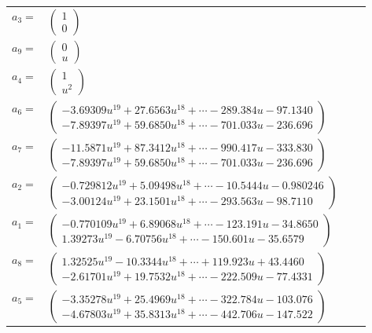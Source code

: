 \documentclass[1p]{elsarticle_modified}
\theoremstyle{definition}
\begin{document}
\begin{tabular}{m{7pt} m{180pt} m{7pt} m{180pt} }
\flushright $a_{3}=$&$\begin{pmatrix}1\\0\end{pmatrix}$ \\
\flushright $a_{9}=$&$\begin{pmatrix}0\\u\end{pmatrix}$ \\
\flushright $a_{4}=$&$\begin{pmatrix}1\\u^2\end{pmatrix}$ \\
\flushright $a_{6}=$&$\begin{pmatrix}-3.69309 u^{19}+27.6563 u^{18}+\cdots-289.384 u-97.1340\\-7.89397 u^{19}+59.6850 u^{18}+\cdots-701.033 u-236.696\end{pmatrix}$ \\
\flushright $a_{7}=$&$\begin{pmatrix}-11.5871 u^{19}+87.3412 u^{18}+\cdots-990.417 u-333.830\\-7.89397 u^{19}+59.6850 u^{18}+\cdots-701.033 u-236.696\end{pmatrix}$ \\
\flushright $a_{2}=$&$\begin{pmatrix}-0.729812 u^{19}+5.09498 u^{18}+\cdots-10.5444 u-0.980246\\-3.00124 u^{19}+23.1501 u^{18}+\cdots-293.563 u-98.7110\end{pmatrix}$ \\
\flushright $a_{1}=$&$\begin{pmatrix}-0.770109 u^{19}+6.89068 u^{18}+\cdots-123.191 u-34.8650\\1.39273 u^{19}-6.70756 u^{18}+\cdots-150.601 u-35.6579\end{pmatrix}$ \\
\flushright $a_{8}=$&$\begin{pmatrix}1.32525 u^{19}-10.3344 u^{18}+\cdots+119.923 u+43.4460\\-2.61701 u^{19}+19.7532 u^{18}+\cdots-222.509 u-77.4331\end{pmatrix}$ \\
\flushright $a_{5}=$&$\begin{pmatrix}-3.35278 u^{19}+25.4969 u^{18}+\cdots-322.784 u-103.076\\-4.67803 u^{19}+35.8313 u^{18}+\cdots-442.706 u-147.522\end{pmatrix}$ \\

\end{tabular}
\end{document}
